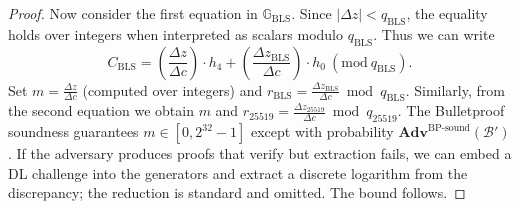 \documentclass[11pt]{article}
\theoremstyle{definitionstyle}
\theoremstyle{plain}
\newcommand{\advantage}[1]{\mathbf{Adv}^{\mathrm{#1}}}
\newcommand{\pmod}[1]{\ (\mathrm{mod}\ #1)}
\begin{document}
\begin{proof}
Now consider the first equation in $\mathbb{G}_{\text{BLS}}$. Since $|\Delta z| < q_{\text{BLS}}$, the equality holds over integers when interpreted as scalars modulo $q_{\text{BLS}}$. Thus we can write
\[
C_{\text{BLS}} = \left(\frac{\Delta z}{\Delta c}\right) \cdot h_4 + \left(\frac{\Delta z_{\text{BLS}}}{\Delta c}\right) \cdot h_0 \pmod{q_{\text{BLS}}}.
\]
Set $m = \frac{\Delta z}{\Delta c}$ (computed over integers) and $r_{\text{BLS}} = \frac{\Delta z_{\text{BLS}}}{\Delta c} \bmod q_{\text{BLS}}$. Similarly, from the second equation we obtain $m$ and $r_{25519} = \frac{\Delta z_{25519}}{\Delta c} \bmod q_{25519}$. The Bulletproof soundness guarantees $m \in [0,2^{32}-1]$ except with probability $\advantage{BP\text{-}sound}(\mathcal{B}')$. If the adversary produces proofs that verify but extraction fails, we can embed a DL challenge into the generators and extract a discrete logarithm from the discrepancy; the reduction is standard and omitted. The bound follows.
\end{proof}
\end{document}

